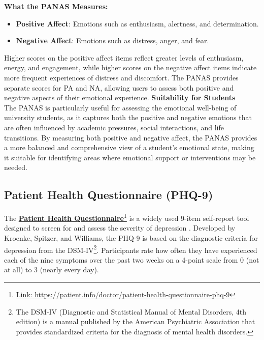 \noindent \textbf{What the PANAS Measures:}
\begin{itemize}
    \item \textbf{Positive Affect}: Emotions such as enthusiasm, alertness, and determination.
    \item \textbf{Negative Affect}: Emotions such as distress, anger, and fear.
\end{itemize}
Higher scores on the positive affect items reflect greater levels of enthusiasm, energy, and engagement, while higher scores on the negative affect items indicate more frequent experiences of distress and discomfort. The PANAS provides separate scores for PA and NA, allowing users to assess both positive and negative aspects of their emotional experience.\vspace{5mm}
\noindent \textbf{Suitability for Students} \\
The PANAS is particularly useful for assessing the emotional well-being of university students, as it captures both the positive and negative emotions that are often influenced by academic pressures, social interactions, and life transitions. By measuring both positive and negative affect, the PANAS provides a more balanced and comprehensive view of a student's emotional state, making it suitable for identifying areas where emotional support or interventions may be needed.

\subsection{Patient Health Questionnaire (PHQ-9)}

The \textbf{\href{https://patient.info/doctor/patient-health-questionnaire-phq-9}{Patient Health Questionnaire}}\footnote{\url{Link: https://patient.info/doctor/patient-health-questionnaire-phq-9}} is a widely used 9-item self-report tool designed to screen for and assess the severity of depression \cite{phq9-review}. Developed by Kroenke, Spitzer, and Williams, the PHQ-9 is based on the diagnostic criteria for depression from the DSM-IV\footnote{The DSM-IV (Diagnostic and Statistical Manual of Mental Disorders, 4th edition) is a manual published by the American Psychiatric Association that provides standardized criteria for the diagnosis of mental health disorders.}. Participants rate how often they have experienced each of the nine symptoms over the past two weeks on a 4-point scale from 0 (not at all) to 3 (nearly every day).\vspace{5mm}

